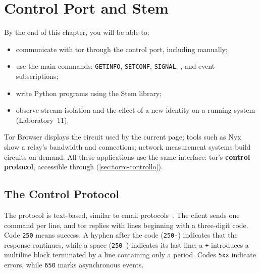 \chapter{Control Port and Stem}\label{cap:18-stem}

\begin{obiettivi}
By the end of this chapter, you will be able to:
\begin{itemize}[nosep]
  \item communicate with tor through the control port, including manually;
  \item use the main commands: \texttt{GETINFO}, \texttt{SETCONF}, \texttt{SIGNAL}, , and event subscriptions;
  \item write Python programs using the Stem library;
  \item observe stream isolation and the effect of a new identity on a running system (Laboratory~11).
\end{itemize}
\end{obiettivi}

Tor Browser displays the circuit used by the current page; tools such as Nyx show a relay's bandwidth and connections; network measurement systems build circuits on demand. All these applications use the same interface: tor's \textbf{control protocol}, accessible through  (\cref{sec:torrc-controllo}).

\section{The Control Protocol}\label{sec:stem-protocollo}

The protocol is text-based, similar to email protocols~. The client sends one command per line, and tor replies with lines beginning with a three-digit code. Code \texttt{250} means success. A hyphen after the code (\texttt{250-}) indicates that the response continues, while a space (\texttt{250 }) indicates its last line; a \texttt{+} introduces a multiline block terminated by a line containing only a period. Codes \texttt{5xx} indicate errors, while \texttt{650} marks asynchronous events.

